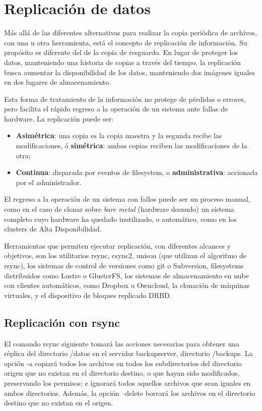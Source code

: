 \section{Replicación de datos} 
Más allá de las diferentes alternativas para realizar la copia periódica de archivos, 
con una u otra herramienta, está el concepto de replicación de información. Su propósito 
es diferente del de la copia de resguardo. En lugar de proteger los datos, manteniendo una 
historia de copias a través del tiempo, la replicación busca aumentar la disponibilidad 
de los datos, manteniendo dos imágenes iguales en dos lugares de almacenamiento. 

Esta forma de tratamiento de la información no protege de pérdidas o errores, pero facilita 
el rápido regreso a la operación de un sistema ante fallas de hardware. La replicación puede ser:
\begin{itemize} 
   \item {\bf Asimétrica}: una copia es la copia maestra y la segunda recibe las modificaciones, ó {\bf simétrica}: ambas copias reciben las modificaciones de la otra;
   \item {\bf Continua}: disparada por eventos de filesystem, o {\bf administrativa}: accionada por el administrador. 
\end{itemize}

El regreso a la operación de un sistema con fallos puede ser un proceso manual, como en el caso 
de clonar sobre \emph{bare metal} (hardware desnudo) un sistema completo cuyo hardware ha quedado 
inutilizado, o automático, como en los clusters de Alta Disponibilidad.

Herramientas que permiten ejecutar replicación, con diferentes alcances y objetivos, son los utilitarios 
rsync, csync2, unison (que utilizan el algoritmo de rsync), los sistemas de control de versiones 
como git o Subversion, filesystems distribuidos como Lustre o GlusterFS, los sistemas de 
almacenamiento en nube con clientes automáticos, como Dropbox o Owncloud, la clonación de 
máquinas virtuales, y el dispositivo de bloques replicado DRBD. 

\subsection{Replicación con rsync}

El comando rsync siguiente tomará las acciones necesarias para obtener una réplica del directorio /datos en el servidor backupserver, directorio /backups. La opción -a copiará todos los archivos en todos los subdirectorios del directorio origen que no existan en el directorio destino, o que hayan sido modificados, preservando los permisos; e ignorará todos aquellos archivos que sean iguales en ambos directorios. Además, la opción --delete borrará los archivos en el directorio destino que no existan en el origen. 

